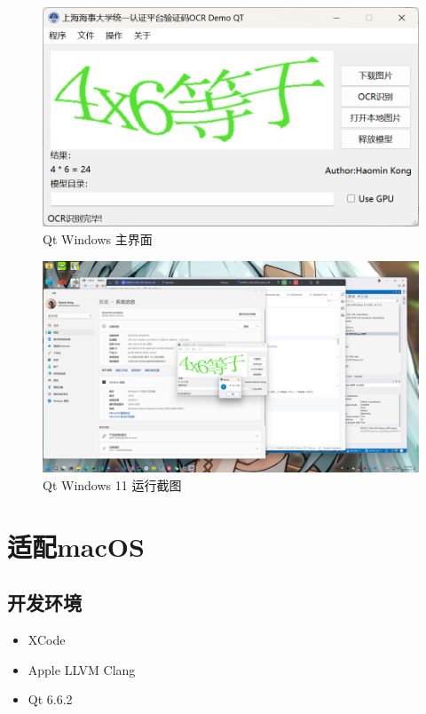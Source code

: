 \begin{figure}
	\centering
	\includegraphics[width=0.9\linewidth]{Resources/Picture/Deploy/Qt/Windows/qt_win_main}
	\caption{Qt Windows 主界面}
	\label{fig:qtwinmain}
\end{figure}

\begin{figure}
	\centering
	\includegraphics[width=0.9\linewidth]{Resources/Picture/Deploy/Qt/Windows/qt_windows}
	\caption{Qt Windows 11 运行截图}
	\label{fig:qtwindows}
\end{figure}

\section{适配macOS}

\subsection{开发环境}

\begin{itemize}
	\item XCode
	\item Apple LLVM Clang
	\item Qt 6.6.2
\end{itemize}

